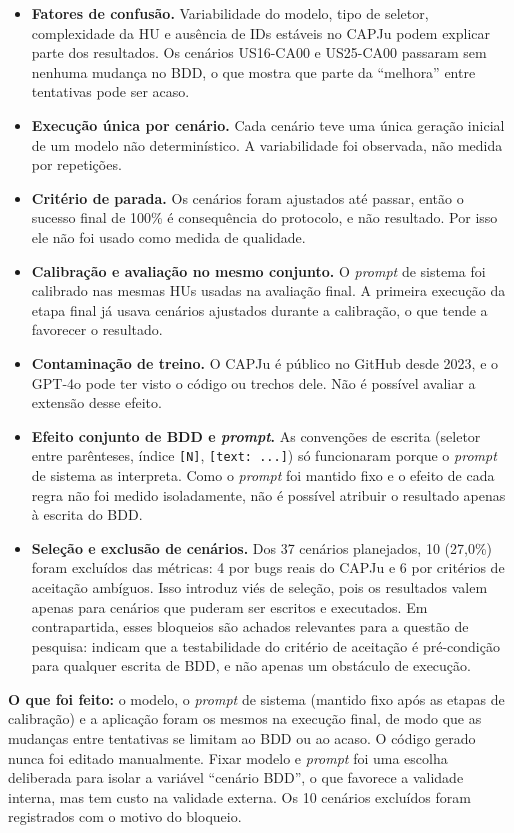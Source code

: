 \begin{itemize}
    \item \textbf{Fatores de confusão.} Variabilidade do modelo, tipo de seletor, complexidade da HU e ausência de IDs estáveis no CAPJu podem explicar parte dos resultados. Os cenários US16-CA00 e US25-CA00 passaram sem nenhuma mudança no BDD, o que mostra que parte da ``melhora'' entre tentativas pode ser acaso.
    \item \textbf{Execução única por cenário.} Cada cenário teve uma única geração inicial de um modelo não determinístico. A variabilidade foi observada, não medida por repetições.
    \item \textbf{Critério de parada.} Os cenários foram ajustados até passar, então o sucesso final de 100\% é consequência do protocolo, e não resultado. Por isso ele não foi usado como medida de qualidade.
    \item \textbf{Calibração e avaliação no mesmo conjunto.} O \textit{prompt} de sistema foi calibrado nas mesmas HUs usadas na avaliação final. A primeira execução da etapa final já usava cenários ajustados durante a calibração, o que tende a favorecer o resultado.
    \item \textbf{Contaminação de treino.} O CAPJu é público no GitHub desde 2023, e o GPT-4o pode ter visto o código ou trechos dele. Não é possível avaliar a extensão desse efeito.
    \item \textbf{Efeito conjunto de BDD e \textit{prompt}.} As convenções de escrita (seletor entre parênteses, índice \texttt{[N]}, \texttt{[text: ...]}) só funcionaram porque o \textit{prompt} de sistema as interpreta. Como o \textit{prompt} foi mantido fixo e o efeito de cada regra não foi medido isoladamente, não é possível atribuir o resultado apenas à escrita do BDD.
    \item \textbf{Seleção e exclusão de cenários.} Dos 37 cenários planejados, 10 (27,0\%) foram excluídos das métricas: 4 por bugs reais do CAPJu e 6 por critérios de aceitação ambíguos. Isso introduz viés de seleção, pois os resultados valem apenas para cenários que puderam ser escritos e executados. Em contrapartida, esses bloqueios são achados relevantes para a questão de pesquisa: indicam que a testabilidade do critério de aceitação é pré-condição para qualquer escrita de BDD, e não apenas um obstáculo de execução.
\end{itemize}

\textbf{O que foi feito:} o modelo, o \textit{prompt} de sistema (mantido fixo após as etapas de calibração) e a aplicação foram os mesmos na execução final, de modo que as mudanças entre tentativas se limitam ao BDD ou ao acaso. O código gerado nunca foi editado manualmente. Fixar modelo e \textit{prompt} foi uma escolha deliberada para isolar a variável ``cenário BDD'', o que favorece a validade interna, mas tem custo na validade externa. Os 10 cenários excluídos foram registrados com o motivo do bloqueio.


